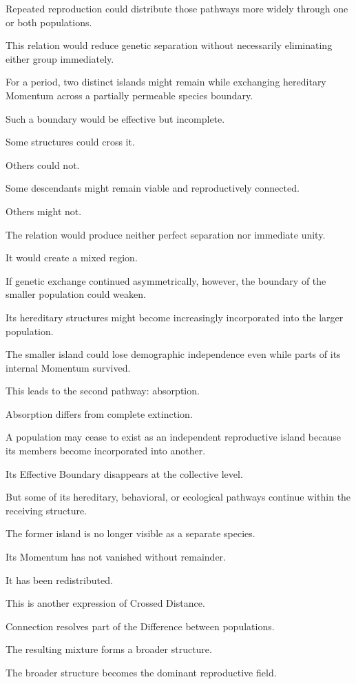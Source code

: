 Repeated reproduction could distribute those pathways more widely through one or both populations.

This relation would reduce genetic separation without necessarily eliminating either group immediately.

For a period, two distinct islands might remain while exchanging hereditary Momentum across a partially permeable species boundary.

Such a boundary would be effective but incomplete.

Some structures could cross it.

Others could not.

Some descendants might remain viable and reproductively connected.

Others might not.

The relation would produce neither perfect separation nor immediate unity.

It would create a mixed region.

If genetic exchange continued asymmetrically, however, the boundary of the smaller population could weaken.

Its hereditary structures might become increasingly incorporated into the larger population.

The smaller island could lose demographic independence even while parts of its internal Momentum survived.

This leads to the second pathway: absorption.

Absorption differs from complete extinction.

A population may cease to exist as an independent reproductive island because its members become incorporated into another.

Its Effective Boundary disappears at the collective level.

But some of its hereditary, behavioral, or ecological pathways continue within the receiving structure.

The former island is no longer visible as a separate species.

Its Momentum has not vanished without remainder.

It has been redistributed.

This is another expression of Crossed Distance.

Connection resolves part of the Difference between populations.

The resulting mixture forms a broader structure.

The broader structure becomes the dominant reproductive field.

